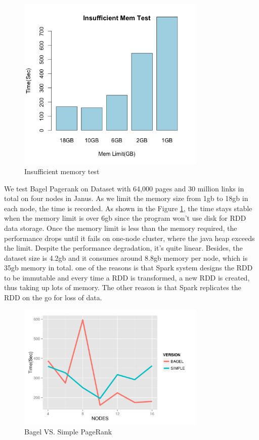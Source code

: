 \documentclass{article}
\begin{document}
\begin{figure}[H]
        \centering
        \includegraphics[width=90mm]{images/insufficient_memory.png}
        \caption{Insufficient memory test}
        \label{fig:insuff-mem}
    \end{figure}

We test Bagel Pagerank on Dataset with 64,000 pages and 30 million links in total on four nodes in Janus. As we limit the memory size from 1gb to 18gb in each node, the time is recorded. As shown in the Figure \ref{fig:insuff-mem}, the time stays stable when the memory limit is over 6gb since the program won’t use disk for RDD data storage. Once the memory limit is less than the memory required, the performance drops until it fails on one-node cluster, where the java heap exceeds the limit. Despite the performance degradation, it’s quite linear. Besides, the dataset size is 4.2gb and it consumes around 8.8gb memory per node, which is 35gb memory in total. one of the reasons is that Spark system designs the RDD to be immutable and every time a RDD is transformed, a new RDD is created, thus taking up lots of memory. The other reason is that Spark replicates the RDD on the go for loss of data.\\

\begin{figure}[H]
        \centering
        \includegraphics[width=90mm]{images/bagelsimple.png}
        \caption{Bagel VS. Simple PageRank}
        \label{fig:bagelsimple}
    \end{figure}
\end{document}
